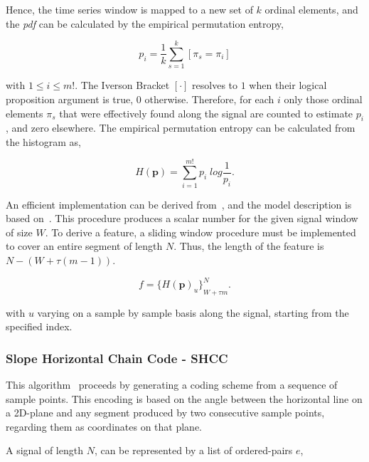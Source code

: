 Hence, the time series window is mapped to a new set of $k$ ordinal elements, and the \textit{pdf} can be calculated by the empirical permutation entropy,

\begin{equation}
p_i = \frac{1}{k} \sum_{s=1}^{k} \left[ \pi_{s} = \pi_{i} \right]
\label{eq:pe4}
\end{equation}

\noindent with $1 \leq i \leq m!$. The Iverson Bracket $ \left[ \cdot \right] $ resolves to $1$ when their logical proposition argument is true, $0$ otherwise. Therefore, for each $i$ only those ordinal elements $\pi_{s}$ that were effectively found along the signal are counted to estimate $p_i$, and zero elsewhere.  The empirical permutation entropy can be calculated from the histogram as,

\begin{equation}
H(\textbf{p}) = \sum_{i=1}^{m!} p_{i} \; log \frac{1}{p_{i}}.
\label{eq:pe5}
\end{equation}

An efficient implementation can be derived from~\cite{Unakafova2013}, and the model description is based on~\cite{Berger2017}.  This procedure produces a scalar number for the given signal window of size $W$.  To derive a feature, a sliding window procedure must be implemented to cover an entire segment of length $N$.  Thus, the length of the feature is $N - (W + \tau (m - 1))$.

\begin{equation}
f =  {\bigg \{ H(\textbf{p})_{u} \bigg \}}_{W + \tau  m}^{N}.
\label{eq:pe6}
\end{equation}

\noindent with $u$ varying on a sample by sample basis along the signal, starting from the specified index.

\subsubsection{Slope Horizontal Chain Code - SHCC}

This algorithm~\cite{Alvarado-Gonzalez2016} proceeds by generating a coding scheme from a sequence of sample points. This encoding is based on the angle between the horizontal line on a 2D-plane and any segment produced by two consecutive sample points, regarding them as coordinates on that plane.  

A signal of length $N$, can be represented by a list of ordered-pairs $e$,

